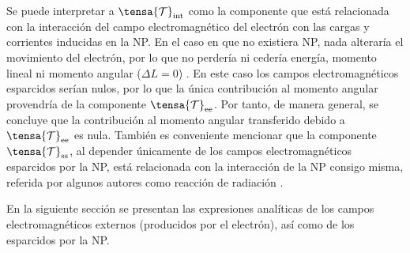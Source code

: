 Se puede interpretar a $\tensa{\mathcal{T}}_{\rm int}$ como la componente que está relacionada con la interacción del campo electromagnético del electrón con las cargas y corrientes inducidas en la NP. En el caso en que no existiera NP, nada alteraría el movimiento del electrón, por lo que no perdería ni cedería energía, momento lineal ni momento angular ($\Delta L = 0$) \cite{castellanos2021phdthesis}. En este caso los campos electromagnéticos esparcidos serían nulos, por lo que la única contribución al momento angular provendría de la componente $\tensa{\mathcal{T}}_{\rm ee}$. Por tanto, de manera general, se concluye que la contribución al momento angular transferido debido a $\tensa{\mathcal{T}}_{\rm ee}$ es nula. También es conveniente mencionar que la componente $\tensa{\mathcal{T}}_{\rm ss}$, al depender únicamente de los campos electromagnéticos esparcidos por la NP, está relacionada con la interacción de la NP consigo misma, referida por algunos autores como reacción de radiación \cite{jackson}.  

En la siguiente sección se presentan las expresiones analíticas de los campos electromagnéticos externos (producidos por el electrón), así como de los esparcidos por la NP.
%
%
